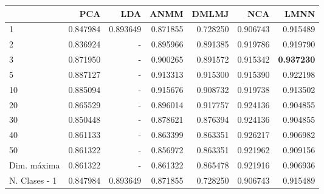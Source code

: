 \begin{tabular}{lrrrrrr}
\toprule
{} &       PCA &       LDA &      ANMM &     DMLMJ &       NCA &      LMNN \\
\midrule
1             &  0.847984 &  0.893649 &  0.871855 &  0.728250 &  0.906743 &  0.915489 \\
2             &  0.836924 &  -        &  0.895966 &  0.891385 &  0.919786 &  0.919790 \\
3             &  0.871950 &  -        &  0.900265 &  0.891572 &  0.915342 &  \textbf{0.937230} \\
5             &  0.887127 &  -        &  0.913313 &  0.915300 &  0.915390 &  0.922198 \\
10            &  0.885094 &  -        &  0.915676 &  0.908732 &  0.919738 &  0.913502 \\
20            &  0.865529 &  -        &  0.896014 &  0.917757 &  0.924136 &  0.904855 \\
30            &  0.850448 &  -        &  0.878621 &  0.876394 &  0.924136 &  0.904855 \\
40            &  0.861133 &  -        &  0.863399 &  0.863351 &  0.926217 &  0.906982 \\
50            &  0.861322 &  -        &  0.856972 &  0.863351 &  0.921962 &  0.909156 \\
Dim. máxima   &  0.861322 &  -        &  0.861322 &  0.865478 &  0.921916 &  0.906936 \\
N. Clases - 1 &  0.847984 &  0.893649 &  0.871855 &  0.728250 &  0.906743 &  0.915489 \\
\bottomrule
\end{tabular}
